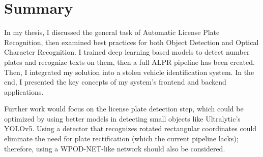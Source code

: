 \chapter{Summary}

In my thesis, I discussed the general task of Automatic License Plate Recognition, then examined best practices for both Object Detection and Optical Character Recognition. I trained deep learning based models to detect number plates and recognize texts on them, then a full ALPR pipeline has been created. Then, I integrated my solution into a stolen vehicle identification system. In the end, I presented the key concepts of my system's frontend and backend applications.

Further work would focus on the license plate detection step, which could be optimized by using better models in detecting small objects like Ultralytic's YOLOv5\cite{YOLOv5}. Using a detector that recognizes rotated rectangular coordinates could eliminate the need for plate rectification (which the current pipeline lacks); therefore, using a WPOD-NET-like network should also be considered.